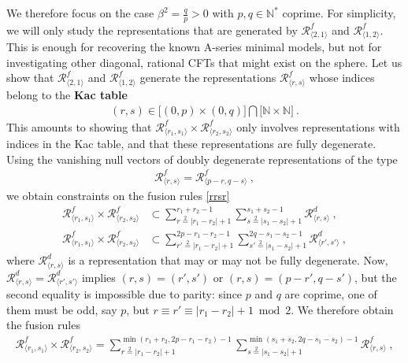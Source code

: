 \documentclass[12pt, a4paper]{article}
\theoremstyle{break}
\begin{document}
We therefore focus on the case $\beta^2 = \frac{q}{p}>0$ with $p,q\in\mathbb{N}^*$ coprime. For simplicity, we will only study the representations that are generated by $\mathcal{R}^f_{\langle 2,1\rangle}$ and $\mathcal{R}^f_{\langle 1,2\rangle}$. This is enough for recovering the known A-series minimal models, but not for investigating other diagonal, rational CFTs that might exist on the sphere. 
Let us show that $\mathcal{R}^f_{\langle 2,1\rangle}$ and $\mathcal{R}^f_{\langle 1,2\rangle}$ generate the representations $\mathcal{R}^f_{\langle r,s\rangle}$  whose indices belong to the \textbf{Kac table} 
\begin{align}
 (r, s) \in \big[(0,p)\times (0,q)\big]\bigcap \big[\mathbb{N}\times \mathbb{N}\big] \ .
 \label{kac}
\end{align}
This amounts to showing that $\mathcal{R}^f_{\langle r_1,s_1\rangle} \times \mathcal{R}^f_{\langle r_2,s_2\rangle}$ only involves representations with indices in the Kac table, and that these representations are fully degenerate. Using the vanishing null vectors of doubly degenerate representations of the type 
\begin{align}
 \mathcal{R}^f_{\langle r,s\rangle} = \mathcal{R}^f_{\langle p-r,q-s\rangle}\ , 
 \label{prqs}
\end{align}
we obtain constraints on the fusion rules \eqref{rrsr}
\begin{align}
 \mathcal{R}^f_{\langle r_1,s_1\rangle} \times \mathcal{R}^f_{\langle r_2,s_2\rangle} &\subset \sum_{r\overset{2}{=} |r_1-r_2|+1}^{r_1+r_2-1}\sum_{s\overset{2}{=} |s_1-s_2|+1}^{s_1+s_2-1} \mathcal{R}^d_{\langle r,s\rangle} \ , 
 \\
 \mathcal{R}^f_{\langle r_1,s_1\rangle} \times \mathcal{R}^f_{\langle r_2,s_2\rangle} &\subset \sum_{r'\overset{2}{=} |r_1-r_2|+1}^{2p-r_1-r_2-1} \sum_{s'\overset{2}{=} |s_1-s_2|+1}^{2q-s_1-s_2-1}\mathcal{R}^d_{\langle r',s'\rangle} \ , 
\end{align}
where $\mathcal{R}^d_{\langle r,s\rangle}$ is a representation that may or may not be fully degenerate. Now, $\mathcal{R}^d_{\langle r,s\rangle} = \mathcal{R}^d_{\langle r',s'\rangle}$ implies $(r,s)=(r',s')$ or $(r,s)=(p-r',q-s')$, but the second equality is impossible due to parity: since $p$ and $q$ are coprime, one of them must be odd, say $p$, but $r\equiv r'\equiv |r_1-r_2|+1\bmod 2$. We therefore obtain the fusion rules 
\begin{align}
 \boxed{\mathcal{R}^f_{\langle r_1,s_1\rangle} \times \mathcal{R}^f_{\langle r_2,s_2\rangle} = \sum_{r\overset{2}{=} |r_1-r_2|+1}^{\min(r_1+r_2,2p-r_1-r_2)-1}\sum_{s\overset{2}{=} |s_1-s_2|+1}^{\min(s_1+s_2,2q-s_1-s_2)-1} \mathcal{R}^f_{\langle r,s\rangle}} \ , 
 \label{rfrf}
\end{align}
\end{document}

